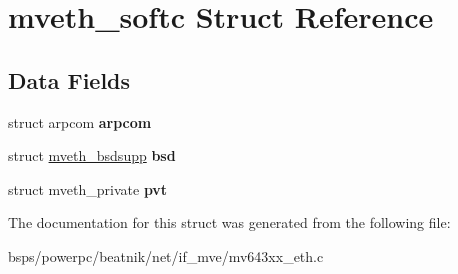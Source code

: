 \hypertarget{structmveth__softc}{}\section{mveth\+\_\+softc Struct Reference}
\label{structmveth__softc}
\subsection*{Data Fields}
\begin{DoxyCompactItemize}
\item 
\mbox{\label{structmveth__softc_a8cc1184243a20dd6cff49e44f1441576}} 
struct arpcom {\bfseries arpcom}
\item 
\mbox{\label{structmveth__softc_ab9f0a143fc39c432fd15dcc4ba18c9ec}} 
struct \mbox{\hyperlink{structmveth__bsdsupp}{mveth\+\_\+bsdsupp}} {\bfseries bsd}
\item 
\mbox{\label{structmveth__softc_a62a005d8189ba02c25e6b1aa6d5af309}} 
struct mveth\+\_\+private {\bfseries pvt}
\end{DoxyCompactItemize}


The documentation for this struct was generated from the following file\+:\begin{DoxyCompactItemize}
\item 
bsps/powerpc/beatnik/net/if\+\_\+mve/mv643xx\+\_\+eth.\+c\end{DoxyCompactItemize}

